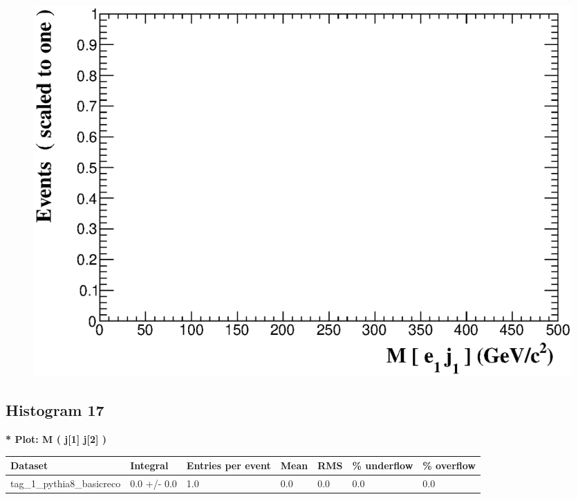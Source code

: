 \documentclass[a4paper, 10pt]{article}
\begin{document}
\begin{figure}[H]
  \begin{center}
    \includegraphics[scale=0.45]{selection_15.eps}\\
\caption{   }
  \end{center}
\end{figure}
      \newpage
\subsection{ Histogram 17}

\textbf{* Plot: M ( j[1] j[2] ) }\\
   \begin{table}[H]
  \begin{center}
    \begin{tabular}{|m{23.0mm}|m{23.0mm}|m{18.0mm}|m{19.0mm}|m{19.0mm}|m{19.0mm}|m{19.0mm}|}
      \hline
      {\cellcolor{yellow}         Dataset}& {\cellcolor{yellow}         Integral}& {\cellcolor{yellow}         Entries per event}& {\cellcolor{yellow}         Mean}& {\cellcolor{yellow}         RMS}& {\cellcolor{yellow}         \% underflow}& {\cellcolor{yellow}         \% overflow}\\
      \hline
      {\cellcolor{white}         tag\_1\_pythia8\_basicreco}& {\cellcolor{white}         0.0 +/\-- 0.0}& {\cellcolor{white}         1.0}& {\cellcolor{white}         0.0}& {\cellcolor{white}         0.0}& {\cellcolor{green}         0.0}& {\cellcolor{green}         0.0}\\
\hline
    \end{tabular}
  \end{center}
\end{table}
\end{document}
